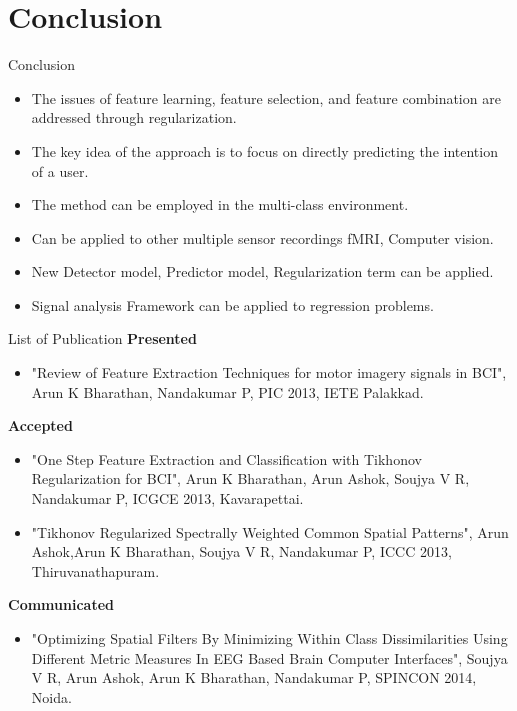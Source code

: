 \documentclass[11pt]{beamer}
\begin{document}
 \section{Conclusion}
\begin{frame}{Conclusion}

 \begin{itemize} [ball]
\item The issues of feature learning, feature selection, and feature combination are addressed through regularization.
\item The key idea of the approach is to focus on directly predicting the intention of a user. 
\item The method can be employed in the multi-class environment.
\item Can be applied to other multiple sensor recordings fMRI, Computer vision.
\item New Detector model, Predictor model, Regularization term can be applied.
\item Signal analysis Framework can be applied to regression problems.
  \end{itemize}
 \end{frame}
\begin{frame}[shrink=5]{List of Publication}
\textbf{Presented}
 \begin{itemize} [ball]
\item "Review of Feature Extraction Techniques for motor imagery signals in BCI", Arun K Bharathan, Nandakumar P, PIC 2013, IETE Palakkad.
  \end{itemize}
\textbf{Accepted}
 \begin{itemize} [ball]
\item "One Step Feature Extraction and Classification with Tikhonov Regularization for BCI", Arun K Bharathan, Arun Ashok, Soujya V R, Nandakumar P, ICGCE 2013, Kavarapettai.
\item "Tikhonov Regularized Spectrally Weighted Common Spatial Patterns", Arun Ashok,Arun K Bharathan, Soujya V R, Nandakumar P, ICCC 2013, Thiruvanathapuram.
  \end{itemize}
  \textbf{Communicated}
   \begin{itemize} [ball]
\item "Optimizing Spatial Filters By Minimizing Within Class Dissimilarities Using Different Metric Measures In EEG Based Brain Computer Interfaces", Soujya V R, Arun Ashok, Arun K Bharathan, Nandakumar P, SPINCON 2014, Noida.
  \end{itemize}
 \end{frame}
\end{document}
